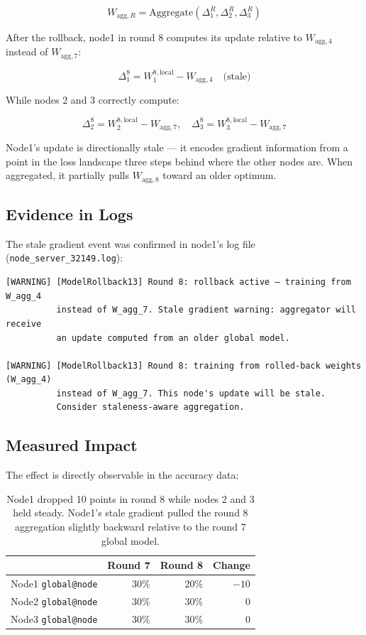 \documentclass[11pt]{article}
\begin{document}
\[
W_{\text{agg},R} = \text{Aggregate}\left(\Delta_1^R, \Delta_2^R, \Delta_3^R\right)
\]

After the rollback, node1 in round 8 computes its update relative to $W_{\text{agg},4}$ instead of $W_{\text{agg},7}$:

\[
\Delta_1^8 = W_1^{8,\text{local}} - W_{\text{agg},4} \quad \text{(stale)}
\]

While nodes 2 and 3 correctly compute:

\[
\Delta_2^8 = W_2^{8,\text{local}} - W_{\text{agg},7}, \quad \Delta_3^8 = W_3^{8,\text{local}} - W_{\text{agg},7}
\]

Node1's update is directionally stale — it encodes gradient information from a point in the loss landscape three steps behind where the other nodes are. When aggregated, it partially pulls $W_{\text{agg},8}$ toward an older optimum.

\subsection{Evidence in Logs}

The stale gradient event was confirmed in node1's log file (\texttt{node\_server\_32149.log}):

\begin{lstlisting}[style=logstyle]
[WARNING] [ModelRollback13] Round 8: rollback active — training from W_agg_4
          instead of W_agg_7. Stale gradient warning: aggregator will receive
          an update computed from an older global model.

[WARNING] [ModelRollback13] Round 8: training from rolled-back weights (W_agg_4)
          instead of W_agg_7. This node's update will be stale.
          Consider staleness-aware aggregation.
\end{lstlisting}

\subsection{Measured Impact}

The effect is directly observable in the accuracy data:

\begin{table}[H]
\centering
\begin{tabular}{lrrr}
\toprule
 & \textbf{Round 7} & \textbf{Round 8} & \textbf{Change} \\
\midrule
Node1 \texttt{global@node} & 30\% & 20\% & $-10$ \\
Node2 \texttt{global@node} & 30\% & 30\% & $0$ \\
Node3 \texttt{global@node} & 30\% & 30\% & $0$ \\
\bottomrule
\end{tabular}
\caption{Node1 dropped 10 points in round 8 while nodes 2 and 3 held steady. Node1's stale gradient pulled the round 8 aggregation slightly backward relative to the round 7 global model.}
\end{table}
\end{document}
